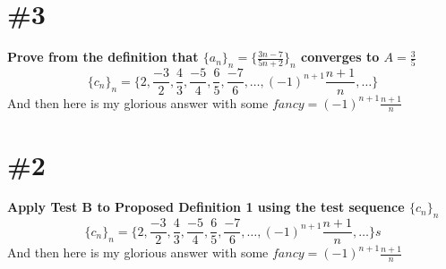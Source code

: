 \documentclass{article}
\begin{document}

\section*{\#3}
\textbf{Prove from the definition that $\{a_{n}\}_{n} = \{\frac{3n-7}{5n+2}\}_n$ converges to $A = \frac{3}{5}$}
\begin{equation} 
\{c_{n}\}_{n} = \{2,\frac{-3}{2},\frac{4}{3},\frac{-5}{4},\frac{6}{5},\frac{-7}{6},\ldots,(-1)^{n+1}\frac{n+1}{n},\ldots\}
\end{equation}
And then here is my glorious answer with some $fancy = (-1)^{n+1}\frac{n+1}{n}$
\vspace{15 mm}
\section*{\#2}
\textbf{Apply Test B to Proposed Definition 1 using the test sequence $\{c_{n}\}_{n}$}
\begin{equation}
\{c_{n}\}_{n} = \{2,\frac{-3}{2},\frac{4}{3},\frac{-5}{4},\frac{6}{5},\frac{-7}{6},\ldots,(-1)^{n+1}\frac{n+1}{n},\ldots\}s
\end{equation}
And then here is my glorious answer with some $fancy = (-1)^{n+1}\frac{n+1}{n}$
\end{document}
